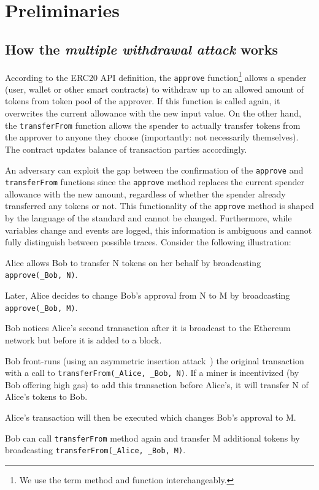 
\section{Preliminaries}

\subsection{How the \textit{multiple withdrawal attack} works}

According to the ERC20 API definition, the \texttt{approve} function\footnote{We use the term method and function interchangeably.}
allows a spender (\eg user, wallet or other smart contracts) to withdraw up to an allowed amount of tokens from token pool of the approver. If this function is called again, it overwrites the current allowance with the new input value. On the other hand, the \texttt{transferFrom} function allows the spender to actually transfer tokens from the approver to anyone they choose (importantly: not necessarily themselves). The contract updates balance of transaction parties accordingly. 

An adversary can exploit the gap between the confirmation of the \texttt{approve} and \texttt{transferFrom} functions since the \texttt{approve} method replaces the current spender allowance with the new amount, regardless of whether the spender already transferred any tokens or not. This functionality of the \texttt{approve} method is shaped by the language of the standard and cannot be changed. Furthermore, while variables change and events are logged, this information is ambiguous and cannot fully distinguish between possible traces. Consider the following illustration:

\begin{compactlistn}
	\item Alice allows Bob to transfer N tokens on her behalf by broadcasting \texttt{approve(\_Bob, N)}.
	\item Later, Alice decides to change Bob's approval from N to M  by broadcasting \texttt{approve(\_Bob, M)}.
	\item Bob notices Alice's second transaction after it is broadcast to the Ethereum network but before it is added to a block.
	\item Bob front-runs (using an asymmetric insertion attack~\cite{eskandari2019sok}) the original transaction with a call to   \texttt{transferFrom(\_Alice, \_Bob, N)}. If a miner is incentivized (\eg by Bob offering high gas) to add this transaction before Alice's, it will transfer N of Alice's tokens to Bob.
	\item Alice's transaction will then be executed which changes Bob's approval to M.
	\item Bob can call \texttt{transferFrom} method again and transfer M additional tokens by broadcasting \texttt{transferFrom(\_Alice, \_Bob, M)}.
\end{compactlistn}

